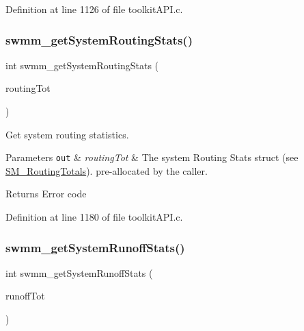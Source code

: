 Definition at line 1126 of file toolkit\+A\+P\+I.\+c.

\mbox{\label{group__tkfuncs_ga8e4dcd4d9243ac428633e7cdabf0712a}} 
\subsubsection{\texorpdfstring{swmm\+\_\+get\+System\+Routing\+Stats()}{swmm\_getSystemRoutingStats()}}
{\footnotesize\ttfamily int swmm\+\_\+get\+System\+Routing\+Stats (\begin{DoxyParamCaption}\item[{\hyperlink{struct_s_m___routing_totals}{S\+M\+\_\+\+Routing\+Totals} $\ast$}]{routing\+Tot }\end{DoxyParamCaption})}



Get system routing statistics. 


\begin{DoxyParams}[1]{Parameters}
\mbox{\tt out}  & {\em routing\+Tot} & The system Routing Stats struct (see \hyperlink{struct_s_m___routing_totals}{S\+M\+\_\+\+Routing\+Totals}). pre-\/allocated by the caller. \\
\hline
\end{DoxyParams}
\begin{DoxyReturn}{Returns}
Error code 
\end{DoxyReturn}


Definition at line 1180 of file toolkit\+A\+P\+I.\+c.

\mbox{\label{group__tkfuncs_gabf3ea290e2af763289e18db435ea2ccd}} 
\subsubsection{\texorpdfstring{swmm\+\_\+get\+System\+Runoff\+Stats()}{swmm\_getSystemRunoffStats()}}
{\footnotesize\ttfamily int swmm\+\_\+get\+System\+Runoff\+Stats (\begin{DoxyParamCaption}\item[{\hyperlink{struct_s_m___runoff_totals}{S\+M\+\_\+\+Runoff\+Totals} $\ast$}]{runoff\+Tot }\end{DoxyParamCaption})}



